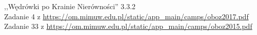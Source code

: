 
,,Wędrówki po Krainie Nierówności'' 3.3.2\\
 Zadanie 4 z \url{https://om.mimuw.edu.pl/static/app_main/camps/oboz2017.pdf}\\
 Zadanie 33 z \url{https://om.mimuw.edu.pl/static/app_main/camps/oboz2015.pdf}\\